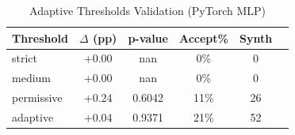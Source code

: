 \begin{table}[htbp]
\centering
\caption{Adaptive Thresholds Validation (PyTorch MLP)}
\label{tab:pytorch_thresholds}
\begin{tabular}{lccccc}
\toprule
Threshold & $\Delta$ (pp) & p-value & Accept\% & Synth \\
\midrule
strict & +0.00 & nan & 0\% & 0 \\
medium & +0.00 & nan & 0\% & 0 \\
permissive & +0.24 & 0.6042 & 11\% & 26 \\
adaptive & +0.04 & 0.9371 & 21\% & 52 \\
\bottomrule
\end{tabular}
\end{table}